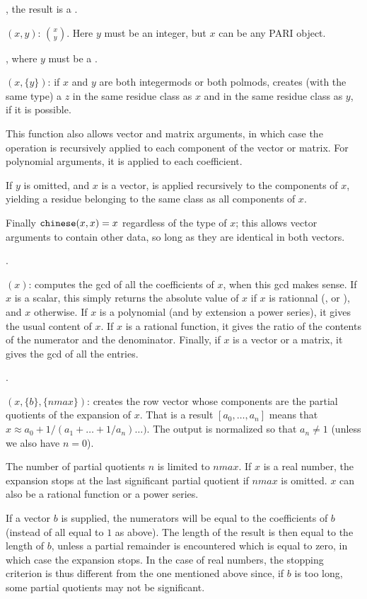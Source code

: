 , the result is a .

$(x,y)$:  $\binom x y$.
Here $y$ must be an integer, but $x$ can be any PARI object.

, where $y$ must be a .

$(x,\{y\})$: if $x$ and $y$ are both integermods or both
polmods, creates (with the same type) a $z$ in the same residue class
as $x$ and in the same residue class as $y$, if it is possible.

This function also allows vector and matrix arguments, in which case the
operation is recursively applied to each component of the vector or matrix.
For polynomial arguments, it is applied to each coefficient.

If $y$ is omitted, and $x$ is a vector,  is applied recursively
to the components of $x$, yielding a residue belonging to the same class as all
components of $x$.

Finally ${\tt chinese}(x,x) = x$ regardless of the type of $x$; this allows
vector arguments to contain other data, so long as they are identical in both
vectors.

.

$(x)$: computes the gcd of all the coefficients of $x$,
when this gcd makes sense. If $x$ is a scalar, this simply returns the
absolute value of $x$ if $x$ is rationnal (,  or
), and $x$ otherwise. If $x$ is a polynomial (and by extension a
power series), it gives the usual content of $x$. If $x$ is a rational
function, it gives the ratio of the contents of the numerator and the
denominator. Finally, if $x$ is a vector or a matrix, it gives the gcd of all
the entries.

.

$(x,\{b\},\{nmax\})$: creates the row vector whose
components are the partial quotients of the 
expansion of $x$. That is a result $[a_0,\dots,a_n]$ means that
$x \approx a_0+1/(a_1+\dots+1/a_n)\dots)$. The output is normalized so that
$a_n \neq 1$ (unless we also have $n = 0$).

The number of partial quotients $n$ is limited to $nmax$. If $x$ is a real
number, the expansion stops at the last significant partial quotient if $nmax$
is omitted. $x$ can also be a rational function or a power series.

If a vector $b$ is supplied, the numerators will be equal to the coefficients
of $b$ (instead of all equal to $1$ as above). The length of the result is
then equal to the length of $b$, unless a partial remainder is encountered
which is equal to zero, in which case the expansion stops. In the case of real
numbers, the stopping criterion is thus different from the one mentioned above
since, if $b$ is too long, some partial quotients may not be significant.

